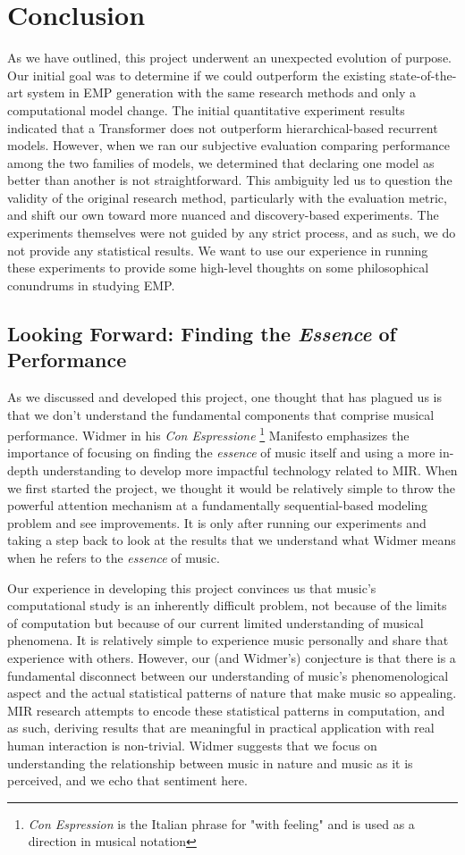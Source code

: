 \chapter{Conclusion} \label{ch:ch8}
As we have outlined, this project underwent an unexpected evolution of purpose. Our initial goal was to determine if we could outperform the existing state-of-the-art system in EMP generation with the same research methods and only a computational model change. The initial quantitative experiment results indicated that a Transformer does not outperform hierarchical-based recurrent models. However, when we ran our subjective evaluation comparing performance among the two families of models, we determined that declaring one model as better than another is not straightforward. This ambiguity led us to question the validity of the original research method, particularly with the evaluation metric, and shift our own toward more nuanced and discovery-based experiments. The experiments themselves were not guided by any strict process, and as such, we do not provide any statistical results. We want to use our experience in running these experiments to provide some high-level thoughts on some philosophical conundrums in studying EMP. 

\section{Looking Forward: Finding the \emph{Essence} of Performance}
As we discussed and developed this project, one thought that has plagued us is that we don't understand the fundamental components that comprise musical performance. Widmer in his \emph{Con Espressione}%
\footnote{\emph{Con Espression} is the Italian phrase for "with feeling" and is used as a direction in musical notation}%
Manifesto\cite{widmer2016getting} emphasizes the importance of focusing on finding the \emph{essence} of music itself and using a more in-depth understanding to develop more impactful technology related to MIR. When we first started the project, we thought it would be relatively simple to throw the powerful attention mechanism at a fundamentally sequential-based modeling problem and see improvements. It is only after running our experiments and taking a step back to look at the results that we understand what Widmer means when he refers to the \emph{essence} of music. 

Our experience in developing this project convinces us that music's computational study is an inherently difficult problem, not because of the limits of computation but because of our current limited understanding of musical phenomena. It is relatively simple to experience music personally and share that experience with others. However, our (and Widmer's) conjecture is that there is a fundamental disconnect between our understanding of music's phenomenological aspect and the actual statistical patterns of nature that make music so appealing. MIR research attempts to encode these statistical patterns in computation, and as such, deriving results that are meaningful in practical application with real human interaction is non-trivial. Widmer suggests that we focus on understanding the relationship between music in nature and music as it is perceived, and we echo that sentiment here. 

